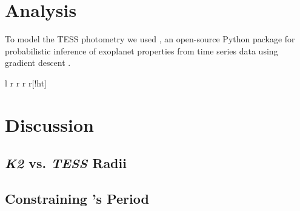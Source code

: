 \documentclass[twocolumn]{aastex631}
\begin{document}
\section{Analysis} \label{sec:analysis}
To model the TESS photometry we used \exoplanet, an open-source Python package for probabilistic inference of exoplanet properties from time series data using gradient descent \citep{exoplanet2019, exoplanet2021}.\begin{deluxetable}{l r r r r}[!ht]
\tabletypesize{\footnotesize}
\startdata
\enddata
\end{deluxetable}


\section{Discussion} \label{sec:discussion}


\subsection{\textit{K2} vs. \textit{TESS} Radii}

\subsection{Constraining \planete's Period}
\end{document}
